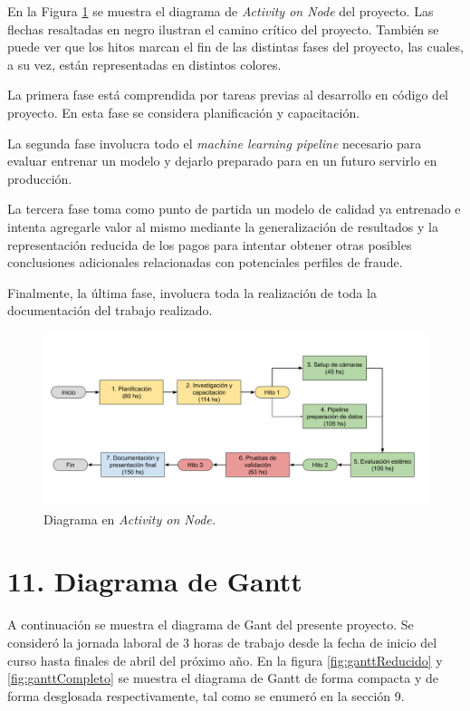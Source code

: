 \documentclass[
11pt, %
]{charter}
\begin{document}
En la Figura \ref{fig:aon} se muestra el diagrama de \emph{Activity on Node} del proyecto. Las flechas resaltadas en negro ilustran el camino crítico del proyecto. También se puede ver que los hitos marcan el fin de las distintas fases del proyecto, las cuales, a su vez, están representadas en distintos colores. 

La primera fase está comprendida por tareas previas al desarrollo en código del proyecto. En esta fase se considera planificación y capacitación.

La segunda fase involucra todo el \emph{machine learning pipeline} necesario para evaluar entrenar un modelo y dejarlo preparado para en un futuro servirlo en producción.

La tercera fase toma como punto de partida un modelo de calidad ya entrenado e intenta agregarle valor al mismo mediante la generalización de resultados y la representación reducida de los pagos para intentar obtener otras posibles conclusiones adicionales relacionadas con potenciales perfiles de fraude.

Finalmente, la última fase, involucra toda la realización de toda la documentación del trabajo realizado.

\begin{figure}[htpb]
\centering 
\includegraphics[width=\textwidth]{./Figuras/aon.png}
\caption{Diagrama en \textit{Activity on Node.}}
\label{fig:aon}
\end{figure}

\section{11. Diagrama de Gantt}
\label{sec:gantt}

A continuación se muestra el diagrama de Gant del presente proyecto. Se consideró la jornada laboral de 3 horas de trabajo desde la fecha de inicio del curso hasta finales de abril del próximo año.
En la figura \ref{fig:ganttReducido} y \ref{fig:ganttCompleto} se muestra el diagrama de Gantt de forma compacta y de forma desglosada respectivamente, tal como se enumeró en la sección 9.
\end{document}
